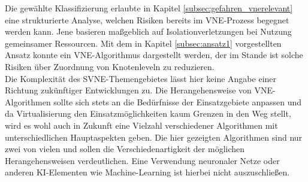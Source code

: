 \documentclass{lni}
\begin{document}
Die gewählte Klassifizierung erlaubte in Kapitel \ref{subsec:gefahren_vnerelevant} eine strukturierte Analyse, welchen Risiken bereits im VNE-Prozess begegnet werden kann.
Jene basieren maßgeblich auf Isolationverletzungen bei Nutzung gemeinsamer Ressourcen. Mit dem in Kapitel \ref{subsec:ansatz1} vorgestellten Ansatz konnte ein VNE-Algorithmus dargestellt werden, der im Stande ist solche Risiken über Zuordnung von Knotenleveln zu reduzieren.\\
Die Komplexität des SVNE-Themengebietes lässt hier keine Angabe einer Richtung zukünftiger Entwicklungen zu. Die Herangehensweise von VNE-Algorithmen sollte sich stets an die Bedürfnisse der Einsatzgebiete anpassen und da Virtualisierung den Einsatzmöglichkeiten kaum Grenzen in den Weg stellt, wird es wohl auch in Zukunft eine Vielzahl verschiedener Algorithmen mit unterschiedlichen Hauptaspekten geben. Die hier gezeigten Algorithmen sind nur zwei von vielen und sollen die Verschiedenartigkeit der möglichen Herangehensweisen verdeutlichen. Eine Verwendung neuronaler Netze oder anderen KI-Elementen wie Machine-Learning ist hierbei nicht auszuschließen.










\nocite{fischer2011position}

~\newpage
{}
\end{document}
